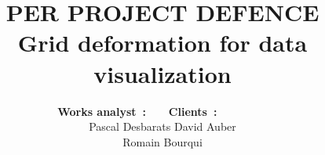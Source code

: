 
\def\presentation{PER PROJECT DEFENCE}
\def\bottomTitle{PER PROJECT}
\def\noteAboutAuthor{Engeneering students/ENSEIRB-MATMECA}
\def\subject{Grid deformation for data visualization}

\title[\bottomTitle]{
        {\bfseries \huge \presentation\\} 
        {\bfseries \subject}
}


\author[\noteAboutAuthor]{    
  {\normalsize \bfseries \sffamily Works analyst~:~~~} 
  \hspace{3cm}
  {\normalsize \bfseries \sffamily Clients~:~~~~~~~~}\\
  [0.06cm]
  Pascal {\sc Desbarats}
  \hspace{3cm}
  David {\sc Auber}\\
  \hspace{7cm}
  Romain {\sc Bourqui}\\    
}

